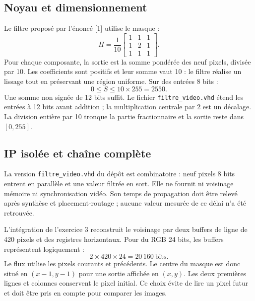 \documentclass[11pt,a4paper]{article}
\begin{document}
\subsection{Noyau et dimensionnement}
Le filtre proposé par l'énoncé [1] utilise le masque :
\[
 H=\frac1{10}
 \begin{bmatrix}
 1&1&1\\1&2&1\\1&1&1
 \end{bmatrix}.
\]
Pour chaque composante, la sortie est la somme pondérée des neuf pixels, divisée par 10. Les coefficients sont positifs et leur somme vaut 10 : le filtre réalise un lissage tout en préservant une région uniforme. Sur des entrées 8 bits :
\[
 0\leq S\leq 10\times255=2550.
\]
Une somme non signée de 12 bits suffit. Le fichier \texttt{filtre\_video.vhd} étend les entrées à 12 bits avant addition ; la multiplication centrale par 2 est un décalage. La division entière par 10 tronque la partie fractionnaire et la sortie reste dans $[0,255]$.

\subsection{IP isolée et chaîne complète}
La version \texttt{filtre\_video.vhd} du dépôt est combinatoire : neuf pixels 8 bits entrent en parallèle et une valeur filtrée en sort. Elle ne fournit ni voisinage mémoire ni synchronisation vidéo. Son temps de propagation doit être relevé après synthèse et placement-routage ; aucune valeur mesurée de ce délai n'a été retrouvée.

L'intégration de l'exercice 3 reconstruit le voisinage par deux buffers de ligne de 420 pixels et des registres horizontaux. Pour du RGB 24 bits, les buffers représentent logiquement :
\[
 2\times420\times24=20\,160\ \mathrm{bits}.
\]
Le flux utilise les pixels courants et précédents. Le centre du masque est donc situé en $(x-1,y-1)$ pour une sortie affichée en $(x,y)$. Les deux premières lignes et colonnes conservent le pixel initial. Ce choix évite de lire un pixel futur et doit être pris en compte pour comparer les images.

\begin{center}
\end{center}
\end{document}
